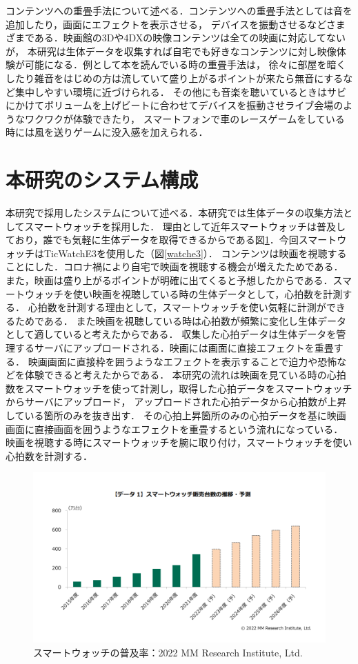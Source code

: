 コンテンツへの重畳手法について述べる．コンテンツへの重畳手法としては音を追加したり，画面にエフェクトを表示させる，
デバイスを振動させるなどさまざまである．映画館の3Dや4DXの映像コンテンツは全ての映画に対応してないが，
本研究は生体データを収集すれば自宅でも好きなコンテンツに対し映像体験が可能になる．例として本を読んでいる時の重畳手法は，
徐々に部屋を暗くしたり雑音をはじめの方は流していて盛り上がるポイントが来たら無音にするなど集中しやすい環境に近づけられる．
その他にも音楽を聴いているときはサビにかけてボリュームを上げビートに合わせてデバイスを振動させライブ会場のようなワクワクが体験できたり，
スマートフォンで車のレースゲームをしている時には風を送りゲームに没入感を加えられる．

\section{本研究のシステム構成}
本研究で採用したシステムについて述べる．本研究では生体データの収集方法としてスマートウォッチを採用した．
理由として近年スマートウォッチは普及しており，誰でも気軽に生体データを取得できるからである図\ref{watchfukyuu}．今回スマートウォッチはTicWatchE3を使用した（図\ref{watche3}）．
コンテンツは映画を視聴することにした．コロナ禍により自宅で映画を視聴する機会が増えたためである．
また，映画は盛り上がるポイントが明確に出てくると予想したからである．スマートウォッチを使い映画を視聴している時の生体データとして，心拍数を計測する．
心拍数を計測する理由として，スマートウォッチを使い気軽に計測ができるためである．
また映画を視聴している時は心拍数が頻繁に変化し生体データとして適していると考えたからである．
収集した心拍データは生体データを管理するサーバにアップロードされる．映画には画面に直接エフェクトを重畳する．
映画画面に直接枠を囲うようなエフェクトを表示することで迫力や恐怖などを体験できると考えたからである．
本研究の流れは映画を見ている時の心拍数をスマートウォッチを使って計測し，取得した心拍データをスマートウォッチからサーバにアップロード，
アップロードされた心拍データから心拍数が上昇している箇所のみを抜き出す．
その心拍上昇箇所のみの心拍データを基に映画画面に直接画面を囲うようなエフェクトを重畳するという流れになっている．
映画を視聴する時にスマートウォッチを腕に取り付け，スマートウォッチを使い心拍数を計測する．



\begin{figure}[H]
    \centering
    \includegraphics[width=14cm]{images/chapter3/watchreserch.png}
    \caption{スマートウォッチの普及率：2022 MM Research Institute, Ltd.}
    \label{watchfukyuu}
\end{figure}

